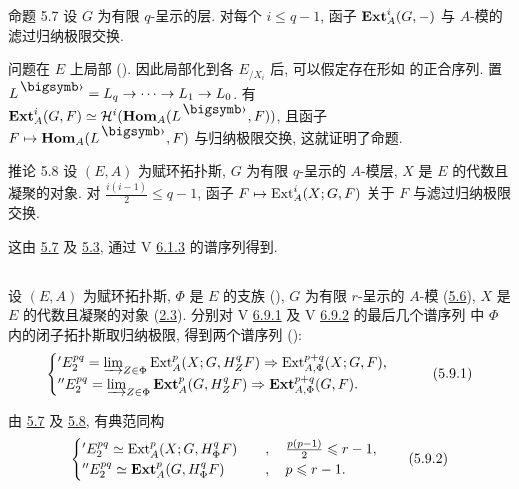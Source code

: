 \begin{enonce*}{命题 5.7}
设 $G$ 为有限 $q$-呈示的层.
对每个 $i\leq q-1$,
函子 $\operatorname{\mathbf{Ext}}^i_A(G,-)$ 与 $A$-模的滤过归纳极限交换.
\end{enonce*}

问题在 $E$ 上局部 ().
因此局部化到各 $E_{/X_i}$ 后,
可以假定存在形如  的正合序列.
置 $L^{\bigdot}=L_q\to\cdots\to L_1\to L_0$.
有 $\Eext^i_A(G,F)\simeq\Hh^i(\Hhom_A(L^{\bigdot},F))$,
且函子 $F\mapsto\Hhom_A(L^{\bigdot},F)$ 与归纳极限交换,
这就证明了命题.

\begin{enonce*}{推论 5.8}
设 $(E,A)$ 为赋环拓扑斯,
$G$ 为有限 $q$-呈示的 $A$-模层,
$X$ 是 $E$ 的代数且凝聚的对象.
对 $\frac{i(i-1)}{2}\leq q-1$,
函子 $F\mapsto\operatorname{Ext}^i_A(X;G,F)$ 关于 $F$ 与滤过归纳极限交换.
\end{enonce*}

这由 \hyperref[VI.prop5.7]{5.7} 及 \hyperref[VI.cor5.3]{5.3},
通过 V \hyperref[V.6.1.3]{6.1.3} 的谱序列得到.

\setcounter{subsection}{8}
\subsection{}

设 $(E,A)$ 为赋环拓扑斯,
$\Phi$ 是 $E$ 的支族
(),
$G$ 为有限 $r$-呈示的 $A$-模
(\hyperref[VI.def5.6]{5.6}),
$X$ 是 $E$ 的代数且凝聚的对象
(\hyperref[VI.def2.3]{2.3}).
分别对 V \hyperref[V.6.9.1]{6.9.1}
及 V \hyperref[V.6.9.2]{6.9.2} 的最后几个谱序列
中 $\Phi$ 内的闭子拓扑斯取归纳极限,
得到两个谱序列 ():
\begin{equation*}
\begin{cases}
'E^{pq}_2 = \varinjlim_{Z \in \Phi} \operatorname{Ext}^p_A (X; G, H^q_Z F)
\Rightarrow \operatorname{Ext}^{p+q}_{A, \Phi} (X; G, F){},\\
''E^{pq}_2 = \varinjlim_{Z \in \Phi} \operatorname{\mathbf{Ext}}^p_A (G, H^q_Z F)
\Rightarrow \operatorname{\mathbf{Ext}}^{p+q}_{A, \Phi} (G, F){}.
\end{cases}\tag{5.9.1}
\end{equation*}

由 \hyperref[VI.prop5.7]{5.7} 及 \hyperref[VI.cor5.8]{5.8},
有典范同构
\begin{equation*}
\begin{cases}
'E^{pq}_2 \simeq \operatorname{Ext}^p_A (X; G, H^q_\Phi F)&\quad,\quad
\frac{p(p-1)}{2} \leqslant r - 1{},\\
''E^{pq}_2 \simeq \operatorname{\mathbf{Ext}}^p_A (G, H^q_\Phi F) &\quad,\quad p \leqslant r-1{}.
\end{cases}\tag{5.9.2}
\end{equation*}

